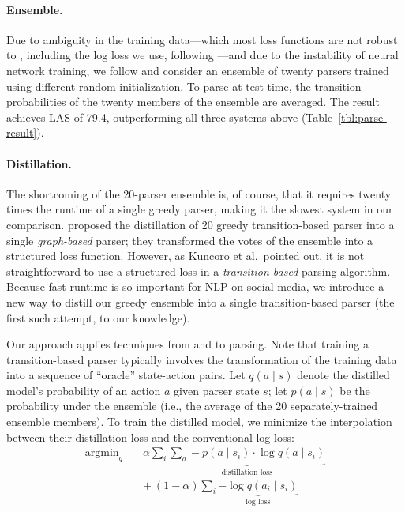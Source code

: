 \documentclass[11pt,a4paper]{article}
\DeclareMathOperator*{\argmin}{argmin}
\begin{document}
\paragraph{Ensemble.}  Due to ambiguity in the training
data---which most loss functions are not robust to \citep{Frnay2014ClassificationIT}, including the log loss we use, following
\citet{ballesteros-dyer-smith:2015:EMNLP}---and due to the instability
of neural network training, we follow \citet{Dietterich2000} and
consider an ensemble of twenty parsers trained using different random
initialization.  To parse at test time, the transition probabilities of the twenty
members of the ensemble are averaged.  The result achieves LAS of
79.4, outperforming all three systems above (Table~\ref{tbl:parse-result}).

\paragraph{Distillation.}  The shortcoming of the 20-parser ensemble is, of
course, that it requires twenty times the runtime of a single greedy
parser, making it the slowest system in our comparison.   proposed the distillation of 20
greedy transition-based parser into a single \emph{graph-based}
parser; they transformed the votes of the ensemble into a structured
loss function.  However, as Kuncoro et al.~pointed out, 
it is not straightforward to use a structured
loss in a \emph{transition-based} parsing algorithm.  Because fast
runtime is so important for NLP on social media, we
introduce a new way to distill our greedy ensemble into a single
transition-based parser (the first such attempt, to our knowledge).  

Our approach applies techniques from 
and  to parsing.
Note that training a transition-based parser typically involves the
transformation of the training data into a sequence of ``oracle'' state-action
pairs.
Let $q(a \mid s)$ denote the distilled model's
probability of an action $a$ given parser state $s$; let $p(a\mid s)$ be the probability under the
ensemble (i.e., the average of the 20 separately-trained ensemble
members).
To train the distilled model, we minimize the interpolation between
their distillation loss and the conventional log loss:
\begin{align}
{\argmin}_q \quad  & \alpha \sum_i \underbrace{\sum_{a} -p(a
	\mid s_i) \cdot \log q(a \mid s_i)}_{\text{distillation loss}} \\
& +\ (1 - \alpha) \sum_i \underbrace{- \log q(a_i \mid
  s_i)}_{\text{log loss}} \nonumber
\end{align}
\end{document}
